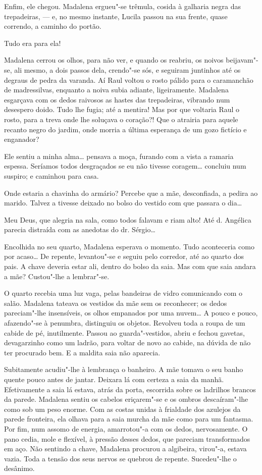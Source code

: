 Enfim, ele chegou. Madalena ergueu"-se trêmula, cosida à galharia negra
das trepadeiras, --- e, no mesmo instante, Lucila passou na sua frente,
quase correndo, a caminho do portão.

Tudo era para ela!

Madalena cerrou os olhos, para não ver, e quando os reabriu, os noivos
beijavam"-se, ali mesmo, a dois passos dela, crendo"-se sós, e seguiram
juntinhos até os degraus de pedra da varanda. Aí Raul voltou o rosto
pálido para o caramanchão de madressilvas, enquanto a noiva subia
adiante, ligeiramente. Madalena esgarçava com os dedos raivosos as
hastes das trepadeiras, vibrando num desespero doido. Tudo lhe fugia;
até a mentira! Mas por que voltaria Raul o rosto, para a treva onde lhe
soluçava o coração?! Que o atrairia para aquele recanto negro do jardim,
onde morria a última esperança de um gozo fictício e enganador?

Ele sentiu a minha alma\ldots{} pensava a moça, furando com a vista a ramaria
espessa. Seríamos todos desgraçados se eu não tivesse coragem\ldots{}
concluiu num suspiro; e caminhou para casa.

Onde estaria a chavinha do armário? Percebe que a mãe, desconfiada, a
pedira ao marido. Talvez a tivesse deixado no bolso do vestido com que
passara o dia\ldots{}

Meu Deus, que alegria na sala, como todos falavam e riam alto! Até d.
Angélica parecia distraída com as anedotas do dr. Sérgio\ldots{}

Encolhida no seu quarto, Madalena esperava o momento. Tudo aconteceria
como por acaso\ldots{} De repente, levantou"-se e seguiu pelo corredor, até ao
quarto dos pais. A chave deveria estar ali, dentro do bolso da saia. Mas
com que saia andara a mãe? Custou"-lhe a lembrar"-se.

O quarto recebia uma luz vaga, pelas bandeiras de vidro comunicando com
o salão. Madalena tateava os vestidos da mãe sem os reconhecer; os dedos
pareciam"-lhe insensíveis, os olhos empanados por uma nuvem\ldots{} A pouco e
pouco, afazendo"-se à penumbra, distinguiu os objetos. Revolveu toda a
roupa de um cabide de pé, inutilmente. Passou ao guarda"-vestidos, abriu
e fechou gavetas, devagarzinho como um ladrão, para voltar de novo ao
cabide, na dúvida de não ter procurado bem. E a maldita saia não
aparecia.

Subitamente acudiu"-lhe à lembrança o banheiro. A mãe tomava o seu banho
quente pouco antes de jantar. Deixara lá com certeza a saia da manhã.
Efetivamente a saia lá estava, atrás da porta, escorrida sobre os
ladrilhos brancos da parede. Madalena sentiu os cabelos eriçarem"-se e os
ombros descaíram"-lhe como sob um peso enorme. Com as costas unidas à
frialdade dos azulejos da parede fronteira, ela olhava para a saia
murcha da mãe como para um fantasma. Por fim, num assomo de energia,
amarrotou"-a com os dedos, nervosamente. O pano cedia, mole e flexível, à
pressão desses dedos, que pareciam transformados em aço. Não sentindo a
chave, Madalena procurou a algibeira, virou"-a, estava vazia. Toda a
tensão dos seus nervos se quebrou de repente. Sucedeu"-lhe o desânimo.


